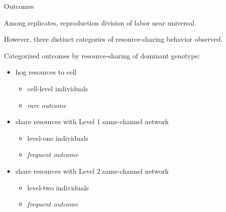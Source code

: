 \begin{frame}{Outcomes}

Among replicates, reproduction division of labor near universal.

\pause
\vspace{2ex}

However, three distinct categories of resource-sharing behavior observed.

\pause
\vspace{2ex}

Categorized outcomes by resource-sharing of dominant genotype:
\begin{itemize}[<+->]
\item hog resources to cell
\pause
\begin{itemize}
\item cell-level individuals
\item \textit{rare outcome}
\end{itemize}
\item share resources with Level 1 same-channel network
\pause
\begin{itemize}
\item level-one individuals
\item \textit{frequent outcome}
\end{itemize}
\item share resources with Level 2 same-channel network
\pause
\begin{itemize}
\item level-two individuals
\item \textit{frequent outcome}
\end{itemize}
\end{itemize}

\end{frame}

